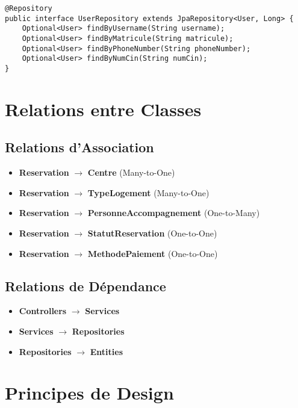 \documentclass[12pt,a4paper]{article}
\begin{document}
\begin{lstlisting}[caption=Repository UserRepository]
@Repository
public interface UserRepository extends JpaRepository<User, Long> {
    Optional<User> findByUsername(String username);
    Optional<User> findByMatricule(String matricule);
    Optional<User> findByPhoneNumber(String phoneNumber);
    Optional<User> findByNumCin(String numCin);
}
\end{lstlisting}

\section{Relations entre Classes}

\subsection{Relations d'Association}

\begin{itemize}
    \item \textbf{Reservation} $\rightarrow$ \textbf{Centre} (Many-to-One)
    \item \textbf{Reservation} $\rightarrow$ \textbf{TypeLogement} (Many-to-One)
    \item \textbf{Reservation} $\rightarrow$ \textbf{PersonneAccompagnement} (One-to-Many)
    \item \textbf{Reservation} $\rightarrow$ \textbf{StatutReservation} (One-to-One)
    \item \textbf{Reservation} $\rightarrow$ \textbf{MethodePaiement} (One-to-One)
\end{itemize}

\subsection{Relations de Dépendance}

\begin{itemize}
    \item \textbf{Controllers} $\rightarrow$ \textbf{Services}
    \item \textbf{Services} $\rightarrow$ \textbf{Repositories}
    \item \textbf{Repositories} $\rightarrow$ \textbf{Entities}
\end{itemize}

\section{Principes de Design}
\end{document}

